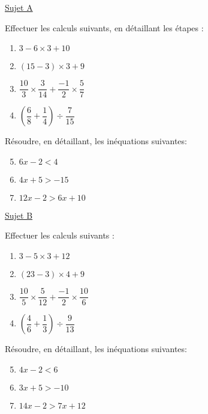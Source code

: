 \documentclass{beamer}
\begin{document}
\small

\begin{frame}
	\setlength{\columnseprule}{0.7pt}
	\begin{multicols}{2}
		\begin{center}
			\uline{Sujet A}\vspace{1em}

			Effectuer les calculs suivants, en détaillant les étapes :

			\begin{enumerate}
				\item $3 - 6 × 3 + 10$\vspace{0.5em}
				\item $(15 - 3) × 3 + 9$\vspace{0.5em}
				\item $\dfrac{10}{3} × \dfrac{3}{14} + \dfrac{-1}{2} × \dfrac{5}{7}$\vspace{0.5em}
				\item $\left(\dfrac{6}{8} + \dfrac{1}{4}\right) ÷ \dfrac{7}{15}$\vspace{0.5em}
			\end{enumerate}

			Résoudre, en détaillant, les inéquations suivantes:

			\begin{enumerate}
				\setcounter{enumi}{4}
				\item $6x - 2 < 4$
				\item $4x + 5 > -15$
				\item $12x - 2 > 6x + 10$
			\end{enumerate}
		\end{center}

		\columnbreak

		\begin{center}
			\uline{Sujet B}\vspace{1em}

			Effectuer les calculs suivants :

			\begin{enumerate}
				\item $3 - 5 × 3 + 12$\vspace{0.5em}
				\item $(23 - 3) × 4 + 9$\vspace{0.5em}
				\item $\dfrac{10}{5} × \dfrac{5}{12} + \dfrac{-1}{2} × \dfrac{10}{6}$\vspace{0.5em}
				\item $\left(\dfrac{4}{6} + \dfrac{1}{3}\right) ÷ \dfrac{9}{13}$\vspace{0.5em}
			\end{enumerate}

			Résoudre, en détaillant, les inéquations suivantes:

			\begin{enumerate}
				\setcounter{enumi}{4}
				\item $4x - 2 < 6$
				\item $3x + 5 > -10$
				\item $14x - 2 > 7x + 12$
			\end{enumerate}
		\end{center}
	\end{multicols}
\end{frame}
\end{document}
